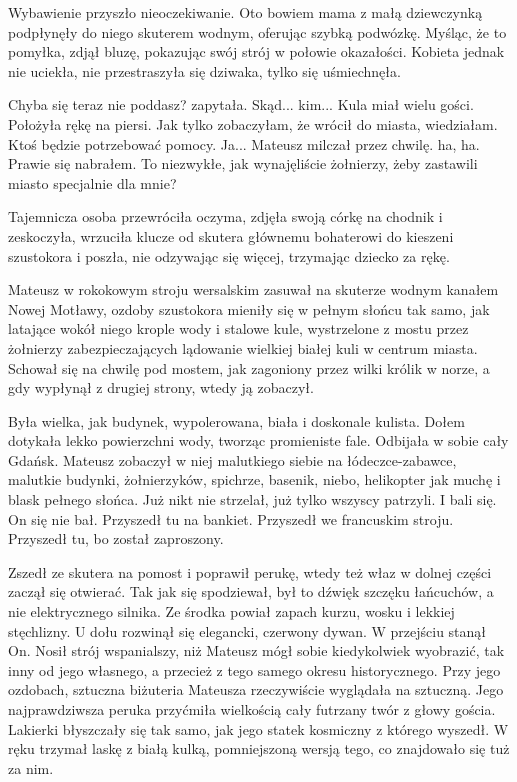Wybawienie przyszło nieoczekiwanie.
Oto bowiem mama z małą dziewczynką podpłynęły do niego skuterem wodnym, oferując szybką podwózkę.
Myśląc, że to pomyłka, zdjął bluzę, pokazując swój strój w połowie okazałości.
Kobieta jednak nie uciekła, nie przestraszyła się dziwaka, tylko się uśmiechnęła.

\begin{dialogue}
\ds{} Chyba się teraz nie poddasz? \dm{} zapytała.
\ds{} Skąd... kim...
\ds{} Kula miał wielu gości. \dm{} Położyła rękę na piersi. \dm{} Jak tylko zobaczyłam, że wrócił do miasta, wiedziałam. Ktoś będzie potrzebować pomocy.
\ds{} Ja... \dm{} Mateusz milczał przez chwilę. \dm{} ha, ha. Prawie się nabrałem.
To niezwykłe, jak wynajęliście żołnierzy, żeby zastawili miasto specjalnie dla mnie?
\end{dialogue}

Tajemnicza osoba przewróciła oczyma, zdjęła swoją córkę na chodnik i zeskoczyła, wrzuciła klucze od skutera głównemu bohaterowi do kieszeni szustokora i poszła, nie odzywając się więcej, trzymając dziecko za rękę.

Mateusz w rokokowym stroju wersalskim zasuwał na skuterze wodnym kanałem Nowej Motławy, ozdoby szustokora mieniły się w pełnym słońcu tak samo, jak latające wokół niego
krople wody i stalowe kule, wystrzelone z mostu przez żołnierzy zabezpieczających
lądowanie wielkiej białej kuli w centrum miasta.
Schował się na chwilę pod mostem, jak zagoniony przez wilki królik w norze, a gdy wypłynął z drugiej strony, wtedy ją zobaczył.

Była wielka, jak budynek, wypolerowana, biała i doskonale kulista.
Dołem dotykała lekko powierzchni wody, tworząc promieniste fale.
Odbijała w sobie cały Gdańsk.
Mateusz zobaczył w niej malutkiego siebie na łódeczce-zabawce, malutkie budynki, żołnierzyków, spichrze, basenik, niebo, helikopter jak muchę i blask pełnego słońca.
Już nikt nie strzelał, już tylko wszyscy patrzyli. I bali się.
On się nie bał. Przyszedł tu na bankiet.
Przyszedł we francuskim stroju.
Przyszedł tu, bo został zaproszony.

Zszedł ze skutera na pomost i poprawił perukę, wtedy też właz w dolnej części zaczął się otwierać.
Tak jak się spodziewał, był to dźwięk szczęku łańcuchów, a nie elektrycznego silnika.
Ze środka powiał zapach kurzu, wosku i lekkiej stęchlizny.
U dołu rozwinął się elegancki, czerwony dywan.
W przejściu stanął On.
Nosił strój wspanialszy, niż Mateusz mógł sobie kiedykolwiek wyobrazić, tak inny od jego własnego, a przecież z tego samego okresu historycznego.
Przy jego ozdobach, sztuczna biżuteria Mateusza rzeczywiście wyglądała na sztuczną.
Jego najprawdziwsza peruka przyćmiła wielkością cały futrzany twór z głowy gościa.
Lakierki błyszczały się tak samo, jak jego statek kosmiczny z którego wyszedł.
W ręku trzymał laskę z białą kulką, pomniejszoną wersją tego, co znajdowało się tuż za nim.

